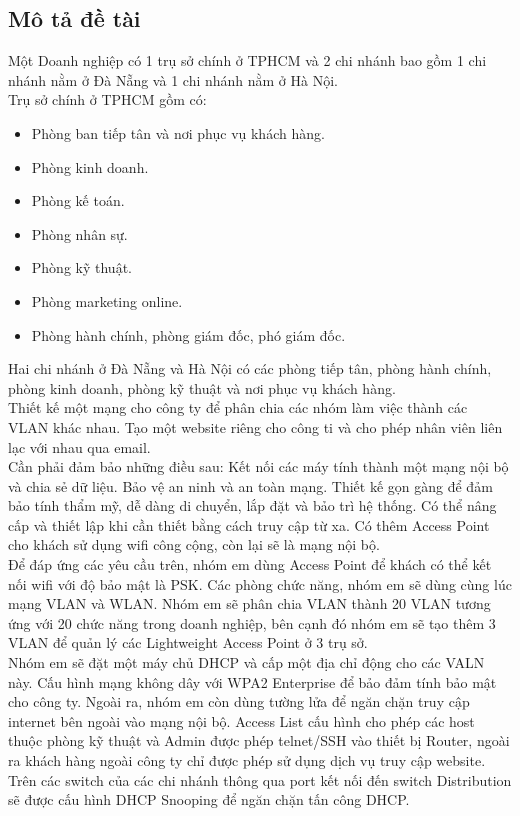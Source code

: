 \documentclass[12pt,a4paper]{report}
\begin{document}
\subsection{Mô tả đề tài}
\hspace*{0.25cm}Một Doanh nghiệp có 1 trụ sở chính ở TPHCM và 2 chi nhánh bao gồm 1 chi nhánh nằm ở Đà Nẵng và 1 chi nhánh nằm ở Hà Nội.  \\
\hspace*{1cm}Trụ sở chính ở TPHCM gồm có:
\begin{itemize}
\item Phòng ban tiếp tân và nơi phục vụ khách hàng.
\item Phòng kinh doanh.
\item Phòng kế toán.
\item Phòng nhân sự.
\item Phòng kỹ thuật.
\item Phòng marketing online.
\item Phòng hành chính, phòng giám đốc, phó giám đốc.
\end{itemize}
\hspace*{1cm}Hai chi nhánh ở Đà Nẵng và Hà Nội có các phòng tiếp tân, phòng hành chính, phòng kinh doanh, phòng kỹ thuật và nơi phục vụ khách hàng.\\
\hspace*{1cm}Thiết kế một mạng cho công ty để phân chia các nhóm làm việc thành các VLAN khác nhau. Tạo một website riêng cho công ti và cho phép nhân viên liên lạc với nhau qua email.\\
\hspace*{1cm}Cần phải đảm bảo những điều sau: Kết nối các máy tính thành một mạng nội bộ và chia sẻ dữ liệu. Bảo vệ an ninh và an toàn mạng. Thiết kế gọn gàng để đảm bảo tính thẩm mỹ, dễ dàng di chuyển, lắp đặt và bảo trì hệ thống. Có thể nâng cấp và thiết lập khi cần thiết bằng cách truy cập từ xa. Có thêm Access Point cho khách sử dụng wifi công cộng, còn lại sẽ là mạng nội bộ. \\
\hspace*{1cm}Để đáp ứng các yêu cầu trên, nhóm em dùng Access Point để khách có thể kết nối wifi với độ bảo mật là PSK. Các phòng chức năng, nhóm em sẽ dùng cùng lúc mạng VLAN và WLAN. Nhóm em sẽ phân chia VLAN thành 20 VLAN tương ứng với 20 chức năng trong doanh nghiệp, bên cạnh đó nhóm em sẽ tạo thêm 3 VLAN để quản lý các Lightweight Access Point ở 3 trụ sở. \\
\hspace*{1cm}Nhóm em sẽ đặt một máy chủ DHCP và cấp một địa chỉ động cho các VALN này. Cấu hình mạng không dây với WPA2 Enterprise để bảo đảm tính bảo mật cho công ty. Ngoài ra, nhóm em còn dùng tường lửa để ngăn chặn truy cập internet bên ngoài vào mạng nội bộ. Access List cấu hình cho phép các host thuộc phòng kỹ thuật và Admin được phép telnet/SSH vào thiết bị Router, ngoài ra khách hàng ngoài công ty chỉ được phép sử dụng dịch vụ truy cập website. Trên các switch của các chi nhánh thông qua port kết nối đến switch Distribution sẽ được cấu hình DHCP Snooping để ngăn chặn tấn công DHCP. \\
\end{document}
